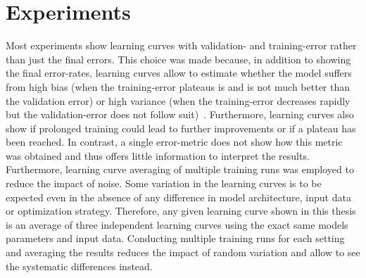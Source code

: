  
\section{Experiments}

Most experiments show learning curves with validation- and training-error rather than just the final errors. This choice was made because, in addition to showing the final error-rates, learning curves allow to estimate whether the model suffers from high bias (when the training-error plateaus is and is not much better than the validation error) or high variance (when the training-error decreases rapidly but the validation-error does not follow suit)~\cite{ml_yearning}. Furthermore, learning curves also show if prolonged training could lead to further improvements or if a plateau has been reached. In contrast, a single error-metric does not show how this metric was obtained and thus offers little information to interpret the results. Furthermore, learning curve averaging of multiple training runs was employed to reduce the impact of noise. Some variation in the learning curves is to be expected even in the absence of any difference in model architecture, input data or optimization strategy. Therefore, any given learning curve shown in this thesis is an average of three independent learning curves using the exact same models parameters and input data. Conducting multiple training runs for each setting and averaging the results reduces the impact of random variation and allow to see the systematic differences instead. 


